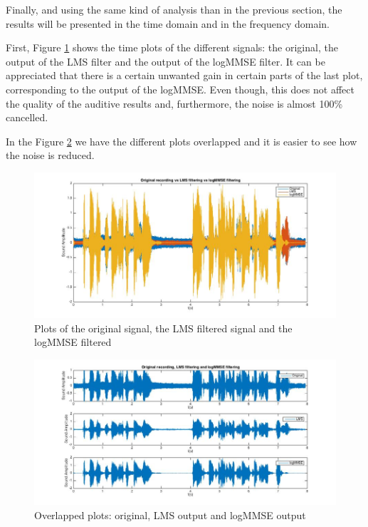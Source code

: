 \documentclass[11pt,a4paper,english]{book}  %
\theoremstyle{definition}  %
\theoremstyle{plain}  %
\theoremstyle{remark}  %
\begin{document}
Finally, and using the same kind of analysis than in the previous section, the results will be presented in the time domain and in the frequency domain.

First, Figure \ref{fig:logmmse1} shows the time plots of the different signals: the original, the output of the LMS filter and the output of the logMMSE filter. It can be appreciated that there is a certain unwanted gain in certain parts of the last plot, corresponding to the output of the logMMSE. Even though, this does not affect the quality of the auditive results and, furthermore, the noise is almost 100\% cancelled.

In the Figure \ref{fig:logmmse2} we have the different plots overlapped and it is easier to see how the noise is reduced.


		\begin{figure}[h]
		\centering
		\includegraphics[width=15cm]{images/theory/logmmse2.jpg}
		\caption{Plots of the original signal, the LMS filtered signal and the logMMSE filtered}
		\label{fig:logmmse1}
		\end{figure}
		
		
		\begin{figure}[h]
		\centering
		\includegraphics[width=15cm]{images/theory/logmmse3.jpg}
		\caption{Overlapped plots: original, LMS output and logMMSE output}
		\label{fig:logmmse2}
		\end{figure}
\end{document}
